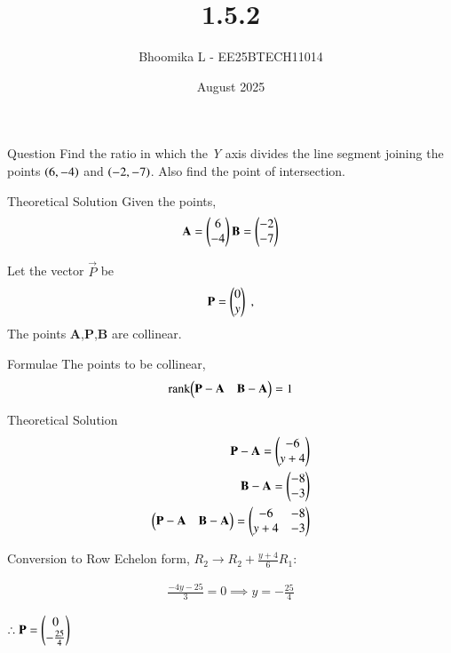 \documentclass{beamer}
\title %
{1.5.2}
\date{August  2025}
\author %
{Bhoomika L - EE25BTECH11014}
\begin{document}
\frame{\titlepage}
\begin{frame}{Question}
 Find the ratio in which the \textit{Y} axis divides the line segment joining the points $\left(6,-4\right)$ and $\left(-2,-7\right)$. Also find the point of intersection.
 \end{frame}

\begin{frame}{Theoretical Solution}
Given the points,
\begin{align}
    \vec{A}=\begin{myvec}{6\\-4}\end{myvec}
    \vec{B}=\begin{myvec}{-2\\-7}\end{myvec}
\end{align}

Let the vector $\vec{P}$ be 
\begin{align}
    \vec{P}=\begin{myvec}{0\\y}\end{myvec} \;, 
\end{align}
The points \textbf{A},\textbf{P},\textbf{B} are collinear.
\end{frame}

\begin{frame}{Formulae}
The points to be collinear,
\begin{align}
	\label{eq:line-rank-2}
	\text{rank}{\ensuremath{\begin{pmatrix}\mathbf{P}-\mathbf{A}& \mathbf{B}-\mathbf{A}\end{pmatrix}}} = 1\\
\end{align}
\end{frame}

\begin{frame}{Theoretical Solution}
\begin{align}
  \mathbf{P}-\mathbf{A} = \begin{pmatrix}-6\\y+4\end{pmatrix}\\
         \mathbf{B}-\mathbf{A} = \begin{pmatrix}-8\\-3\end{pmatrix}\\
        \begin{pmatrix}\mathbf{P}-\mathbf{A}& \mathbf{B}-\mathbf{A}\end{pmatrix} = \begin{pmatrix}-6 & -8\\ y+4&-3 \end{pmatrix}
 \end{align}
 
\begin{center}
 Conversion to Row Echelon form,
$R_2 \rightarrow R_2 + \frac{y+4}{6}R_1 :$ 
\implies
{}\\
\end{center}
 \begin{align}
 \frac{-4y-25}{3}=0\implies y=-\frac{25}{4}
 \end{align}
  \begin{center}
      $\therefore \vec{P}=\begin{myvec}{0\\-\frac{25}{4}}\end{myvec}$
 \end{center}
 \end{frame}
\end{document}
